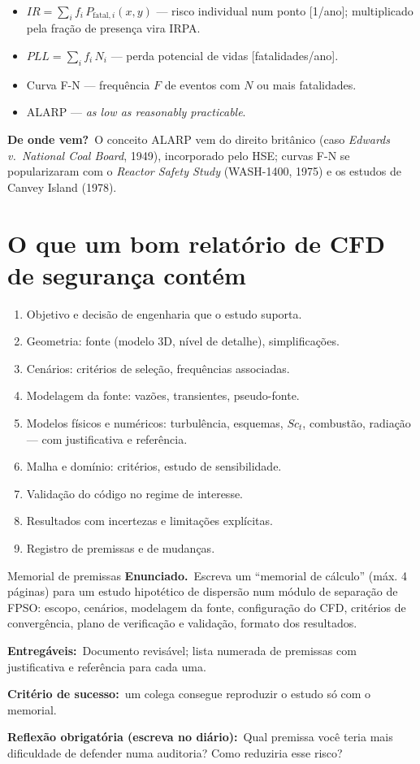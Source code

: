 \documentclass[10pt,a4paper,twocolumn,openany]{report}
\newcommand{\lead}[2]{\par\medskip\noindent{\color{#1}\bfseries #2}\ }
\newenvironment{conceito}[1]{\section{#1}}{\par}
\newenvironment{dicionario}[1][Dicionário da equação]{\lead{azul}{#1.}\small}{\par\medskip}
\newcommand{\origem}{\par\smallskip\noindent\textcolor{azul}{\textbf{De onde vem?}}\ }
\newcommand{\enunciado}{\noindent\textbf{Enunciado.}\ }
\newcommand{\entregaveis}{\par\medskip\noindent\textbf{Entregáveis:}}
\newcommand{\criterio}{\par\medskip\noindent\textbf{Critério de sucesso:}\ }
\newcommand{\reflexao}{\par\medskip\noindent\textbf{Reflexão obrigatória (escreva no diário):}}
\begin{document}
\begin{dicionario}[Dicionário da equação: medidas de risco]
\begin{itemize}[leftmargin=*,nosep]
  \item $IR=\sum_i f_i\,P_{\text{fatal},i}(x,y)$ --- risco individual num
        ponto [1/ano]; multiplicado pela fração de presença vira IRPA.
  \item $PLL=\sum_i f_i\,N_i$ --- perda potencial de vidas [fatalidades/ano].
  \item Curva F-N --- frequência $F$ de eventos com $N$ ou mais fatalidades.
  \item ALARP --- \emph{as low as reasonably practicable}.
\end{itemize}
\origem O conceito ALARP vem do direito britânico (caso \emph{Edwards
v.\ National Coal Board}, 1949), incorporado pelo HSE; curvas F-N se
popularizaram com o \emph{Reactor Safety Study} (WASH-1400, 1975) e os
estudos de Canvey Island (1978).
\end{dicionario}


\begin{conceito}{O que um bom relatório de CFD de segurança contém}
\begin{enumerate}
  \item Objetivo e decisão de engenharia que o estudo suporta.
  \item Geometria: fonte (modelo 3D, nível de detalhe), simplificações.
  \item Cenários: critérios de seleção, frequências associadas.
  \item Modelagem da fonte: vazões, transientes, pseudo-fonte.
  \item Modelos físicos e numéricos: turbulência, esquemas, $Sc_t$, combustão,
        radiação --- com justificativa e referência.
  \item Malha e domínio: critérios, estudo de sensibilidade.
  \item Validação do código no regime de interesse.
  \item Resultados com incertezas e limitações explícitas.
  \item Registro de premissas e de mudanças.
\end{enumerate}
\end{conceito}

\begin{tarefa}{Memorial de premissas}
\enunciado Escreva um ``memorial de cálculo'' (máx. 4 páginas) para um
estudo hipotético de dispersão num módulo de separação de FPSO: escopo,
cenários, modelagem da fonte, configuração do CFD, critérios de convergência,
plano de verificação e validação, formato dos resultados.
\entregaveis\ Documento revisável; lista numerada de premissas com
justificativa e referência para cada uma.
\criterio um colega consegue reproduzir o estudo só com o memorial.
\reflexao\ Qual premissa você teria mais dificuldade de defender numa
auditoria? Como reduziria esse risco?
\end{tarefa}
\end{document}
